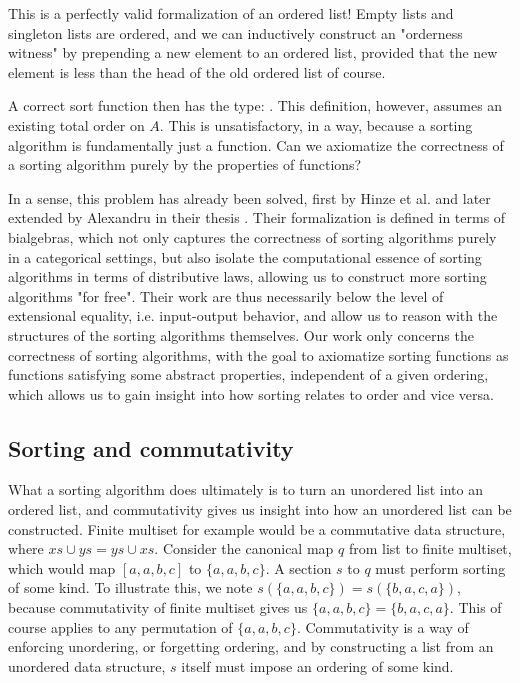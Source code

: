 This is a perfectly valid formalization of an ordered list! Empty lists and singleton lists
are ordered, and we can inductively construct an "orderness witness" by prepending a new element
to an ordered list, provided that the new element is less than the head of the old ordered list of
course. 

A correct sort function then has the type: .
This definition, however, assumes an existing total order on $A$. This is
unsatisfactory, in a way, because a sorting algorithm is fundamentally just a function. Can we
axiomatize the correctness of a sorting algorithm purely by the properties of functions?


In a sense, this problem has already been solved, first by Hinze et al. \cite{hinzeSortingBialgebrasDistributive2012}
and later extended by Alexandru in their thesis \cite{alexandruIntrinsicallyCorrectSorting2023}.
Their formalization is defined in terms of bialgebras, which not
only captures the correctness of sorting algorithms purely in a categorical settings, but
also isolate the computational essence of sorting algorithms in terms of distributive laws,
allowing us to construct more sorting algorithms "for free". Their work are thus necessarily
below the level of extensional equality, i.e. input-output behavior, and allow us to reason
with the structures of the sorting algorithms themselves. Our work only concerns the correctness
of sorting algorithms, with the goal to axiomatize sorting functions as functions satisfying
some abstract properties, independent of a given ordering, which allows us to gain
insight into how sorting relates to order and vice versa.

\subsection*{Sorting and commutativity}
What a sorting algorithm does ultimately is to turn an unordered list into an ordered list,
and commutativity gives us insight into how an unordered list can be constructed.
Finite multiset for example would be a commutative data structure, where $xs \cup ys = ys \cup xs$.
Consider the canonical map $q$ from list to finite multiset, which would map
$[a, a, b, c]$ to $\{a, a, b, c\}$. A section $s$ to $q$ must perform sorting of some kind.
To illustrate this, we note $s(\{a, a, b, c\}) = s(\{b, a, c, a\})$, because commutativity
of finite multiset gives us $\{a, a, b, c\} = \{b, a, c, a\}$. This of course applies to
any permutation of $\{a, a, b, c\}$. Commutativity is a way of enforcing unordering,
or forgetting ordering, and by constructing a list from an unordered data structure, $s$ itself
must impose an ordering of some kind.


